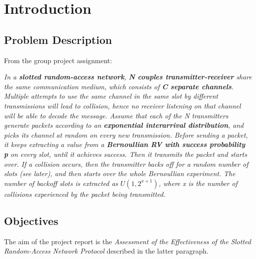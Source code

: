 \section{Introduction}
\subsection{Problem Description}
From the group project assignment:
\vspace{0.4cm}

\textit{In a \textbf{slotted random-access network}, \textbf{N couples transmitter-receiver} share the same communication
medium, which consists of \textbf{C separate channels}. Multiple attempts to use the same channel in the
same slot by different transmissions will lead to collision, hence no receiver listening on that
channel will be able to decode the message.
Assume that each of the N transmitters generate packets according to an \textbf{exponential interarrival
distribution}, and picks its channel at random on every new transmission. Before sending a packet, it
keeps extracting a value from a \textbf{Bernoullian RV with success probability p} on every slot, until it
achieves success. Then it transmits the packet and starts over. If a collision occurs, then the
transmitter backs off for a random number of slots (see later), and then starts over the whole
Bernoullian experiment.
The number of backoff slots is extracted as $U(1, 2^{x+1})$, where x is the number of collisions
experienced by the packet being transmitted.}
\subsection{Objectives}
The aim of the project report is the \textit{Assessment of the Effectiveness of the Slotted Random-Access Network Protocol} described in the latter paragraph.
